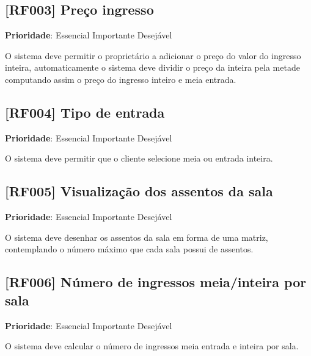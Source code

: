 \documentclass[12pt,a4paper]{article}
\begin{document}
\subsection{[RF003] Preço ingresso}

\textbf{Prioridade}:
\mbox{\ooalign{$\checkmark$\cr\hidewidth$\square$\hidewidth\cr}} Essencial
\mbox{\ooalign{\cr\hidewidth$\square$\hidewidth\cr}} Importante
\mbox{\ooalign{\cr\hidewidth$\square$\hidewidth\cr}} Desejável

O sistema deve permitir o proprietário a adicionar o preço do valor do
ingresso inteira, automaticamente o sistema deve dividir o preço da inteira
pela metade computando assim o preço do ingresso inteiro e meia entrada.

\subsection{[RF004] Tipo de entrada}

\textbf{Prioridade}:
\mbox{\ooalign{$\checkmark$\cr\hidewidth$\square$\hidewidth\cr}} Essencial
\mbox{\ooalign{\cr\hidewidth$\square$\hidewidth\cr}} Importante
\mbox{\ooalign{\cr\hidewidth$\square$\hidewidth\cr}} Desejável

O sistema deve permitir que o cliente selecione meia ou entrada inteira.

\subsection{[RF005] Visualização dos assentos da sala}

\textbf{Prioridade}:
\mbox{\ooalign{$\checkmark$\cr\hidewidth$\square$\hidewidth\cr}} Essencial
\mbox{\ooalign{\cr\hidewidth$\square$\hidewidth\cr}} Importante
\mbox{\ooalign{\cr\hidewidth$\square$\hidewidth\cr}} Desejável

O sistema deve desenhar os assentos da sala em forma de uma matriz, contemplando
o número máximo que cada sala possui de assentos.

\subsection{[RF006] Número de ingressos meia/inteira por sala}

\textbf{Prioridade}:
\mbox{\ooalign{$\checkmark$\cr\hidewidth$\square$\hidewidth\cr}} Essencial
\mbox{\ooalign{\cr\hidewidth$\square$\hidewidth\cr}} Importante
\mbox{\ooalign{\cr\hidewidth$\square$\hidewidth\cr}} Desejável

O sistema deve calcular o número de ingressos meia entrada e inteira por sala.
\end{document}

